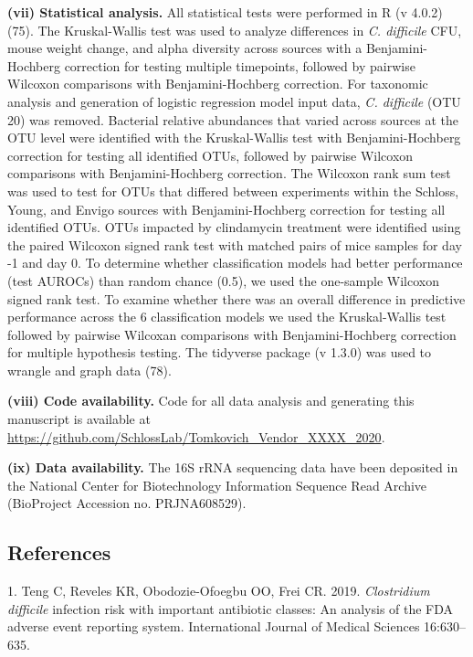 \documentclass[
  11pt,
]{article}
\begin{document}
\textbf{(vii) Statistical analysis.} All statistical tests were
performed in R (v 4.0.2) (75). The Kruskal-Wallis test was used to
analyze differences in \emph{C. difficile} CFU, mouse weight change, and
alpha diversity across sources with a Benjamini-Hochberg correction for
testing multiple timepoints, followed by pairwise Wilcoxon comparisons
with Benjamini-Hochberg correction. For taxonomic analysis and
generation of logistic regression model input data, \emph{C. difficile}
(OTU 20) was removed. Bacterial relative abundances that varied across
sources at the OTU level were identified with the Kruskal-Wallis test
with Benjamini-Hochberg correction for testing all identified OTUs,
followed by pairwise Wilcoxon comparisons with Benjamini-Hochberg
correction. The Wilcoxon rank sum test was used to test for OTUs that
differed between experiments within the Schloss, Young, and Envigo
sources with Benjamini-Hochberg correction for testing all identified
OTUs. OTUs impacted by clindamycin treatment were identified using the
paired Wilcoxon signed rank test with matched pairs of mice samples for
day -1 and day 0. To determine whether classification models had better
performance (test AUROCs) than random chance (0.5), we used the
one-sample Wilcoxon signed rank test. To examine whether there was an
overall difference in predictive performance across the 6 classification
models we used the Kruskal-Wallis test followed by pairwise Wilcoxan
comparisons with Benjamini-Hochberg correction for multiple hypothesis
testing. The tidyverse package (v 1.3.0) was used to wrangle and graph
data (78).

\textbf{(viii) Code availability.} Code for all data analysis and
generating this manuscript is available at
\url{https://github.com/SchlossLab/Tomkovich_Vendor_XXXX_2020}.

\textbf{(ix) Data availability.} The 16S rRNA sequencing data have been
deposited in the National Center for Biotechnology Information Sequence
Read Archive (BioProject Accession no. PRJNA608529).

\newpage

\hypertarget{references}{%
\subsection{References}\label{references}}

\hypertarget{refs}{}
\leavevmode\hypertarget{ref-Teng2019}{}%
1. Teng C, Reveles KR, Obodozie-Ofoegbu OO, Frei CR. 2019.
\emph{Clostridium difficile} infection risk with important antibiotic
classes: An analysis of the FDA adverse event reporting system.
International Journal of Medical Sciences 16:630--635.
\end{document}
